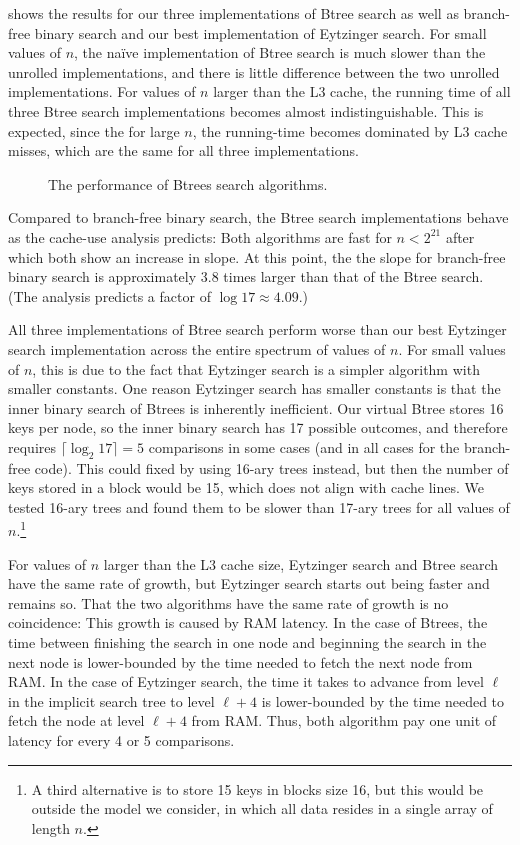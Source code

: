 \documentclass{patmorin}
\begin{document}
 shows the results for our three implementations of
Btree search as well as branch-free binary search and our best implementation
of Eytzinger search.  For small values of $n$, the na\"ive implementation
of Btree search is much slower than the unrolled implementations, and there
is little difference between the two unrolled implementations. For values
of $n$ larger than the L3 cache, the running time of all three Btree
search implementations becomes almost indistinguishable. This is expected,
since the for large $n$, the running-time becomes dominated by L3 cache
misses, which are the same for all three implementations.

\begin{figure}
   \caption{The performance of Btrees search algorithms.}
\end{figure}


Compared to branch-free binary search, the Btree search implementations
behave as the cache-use analysis predicts:  Both algorithms are fast for
$n<2^{21}$ after which both show an increase in slope. At this point,
the the slope for branch-free binary search is approximately 3.8 times
larger than that of the Btree search. (The analysis predicts a factor
of $\log 17\approx 4.09$.)

All three implementations of Btree search perform worse than our best
Eytzinger search implementation across the entire spectrum of values
of $n$.  For small values of $n$, this is due to the fact that Eytzinger
search is a simpler algorithm with smaller constants.  One reason
Eytzinger search has smaller constants is that the inner binary search
of Btrees is inherently inefficient. Our virtual Btree stores 16 keys per
node, so the inner binary search has 17 possible outcomes, and therefore
requires $\lceil\log_2 17\rceil=5$ comparisons in some cases (and in
all cases for the branch-free code).  This could fixed by using 16-ary
trees instead, but then the number of keys stored in a block would be 15,
which does not align with cache lines.  We tested 16-ary trees and found
them to be slower than 17-ary trees for all values of $n$.\footnote{A
third alternative is to store 15 keys in blocks size 16, but this would
be outside the model we consider, in which all data resides in a single
array of length $n$.}

For values of $n$ larger than the L3 cache size, Eytzinger search and
Btree search have the same rate of growth, but Eytzinger search starts
out being faster and remains so.  That the two algorithms have the same
rate of growth is no coincidence: This growth is caused by RAM latency.
In the case of Btrees, the time between finishing the search in one
node and beginning the search in the next node is lower-bounded by the
time needed to fetch the next node from RAM.  In the case of Eytzinger
search, the time it takes to advance from level $\ell$ in the implicit
search tree to level $\ell+4$ is lower-bounded by the time needed to fetch
the node at level $\ell+4$ from RAM.  Thus, both algorithm pay one unit of
latency for every 4 or 5 comparisons.
\end{document}
